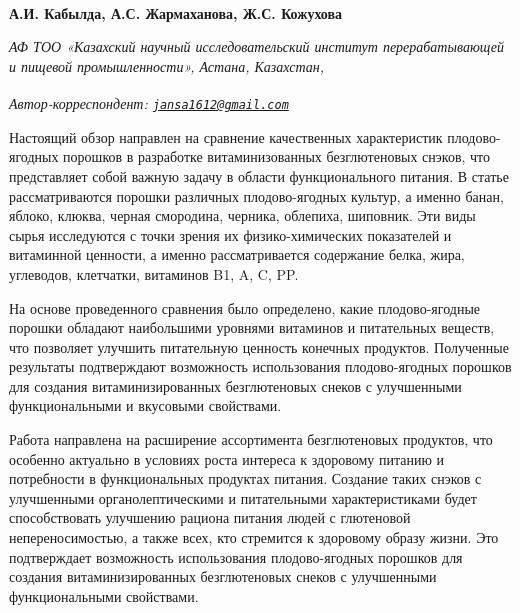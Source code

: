 
\begin{articleheader}

{\bfseries
А.И. Кабылда,
А.С. Жармаханова,
Ж.С. Кожухова\textsuperscript{\envelope } }
\end{articleheader}

\begin{affiliation}
\emph{АФ ТОО «Казахский научный исследовательский институт перерабатывающей и пищевой промышленности», Астана, Казахстан,}

\raggedright \textsuperscript{\envelope }{\em Автор-корреспондент: \href{mailto:jansa1612@gmail.com}{\nolinkurl{jansa1612@gmail.com}}}
\end{affiliation}

Настоящий обзор направлен на сравнение качественных характеристик
плодово-ягодных порошков в разработке витаминизованных безглютеновых
снэков, что представляет собой важную задачу в области функционального
питания. В статье рассматриваются порошки различных плодово-ягодных
культур, а именно банан, яблоко, клюква, черная смородина, черника,
облепиха, шиповник. Эти виды сырья исследуются с точки зрения их
физико-химических показателей и витаминной ценности, а именно
рассматривается содержание белка, жира, углеводов, клетчатки, витаминов
B1, A, C, PP.

На основе проведенного сравнения было определено, какие плодово-ягодные
порошки обладают наибольшими уровнями витаминов и питательных веществ,
что позволяет улучшить питательную ценность конечных продуктов.
Полученные результаты подтверждают возможность использования
плодово-ягодных порошков для создания витаминизированных безглютеновых
снеков с улучшенными функциональными и вкусовыми свойствами.

Работа направлена на расширение ассортимента безглютеновых продуктов,
что особенно актуально в условиях роста интереса к здоровому питанию и
потребности в функциональных продуктах питания. Создание таких снэков с
улучшенными органолептическими и питательными характеристиками будет
способствовать улучшению рациона питания людей с глютеновой
непереносимостью, а также всех, кто стремится к здоровому образу жизни.
Это подтверждает возможность использования плодово-ягодных порошков для
создания витаминизированных безглютеновых снеков с улучшенными
функциональными свойствами.

